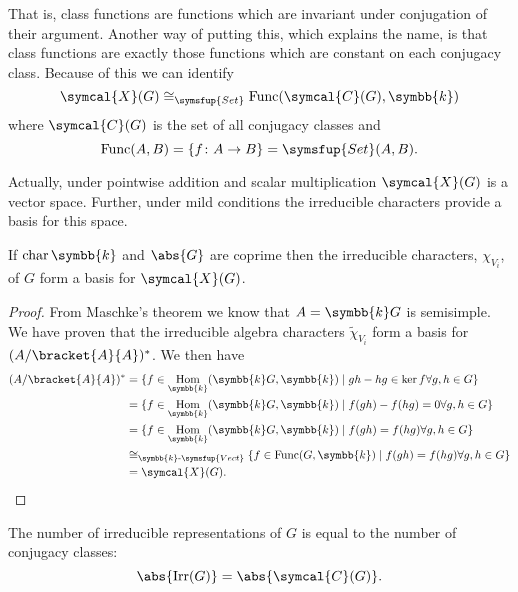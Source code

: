 \documentclass[fleqn]{NotesClass}
\makeatletter
\renewcommand{\field}{\symbb{k}}
\DeclareMathOperator{\Hom}{Hom}
\newcommand{\c@egory}[1]{\symsfup{#1}}
\newcommand{\Vect}[1][\field]{#1\text{-}\c@egory{Vect}}
\newcommand{\Set}{\c@egory{Set}}
\newcommand{\isomorphic}{\cong}
\DeclareMathOperator{\Irr}{Irr}
\DeclareMathOperator{\Char}{char}
\newcommand{\classFunctions}{\symcal{X}}
\newcommand{\conjugacyClasses}{\symcal{C}}
\DeclareMathOperator{\Func}{Func}
\makeatother
\begin{document}
    That is, class functions are functions which are invariant under conjugation of their argument.
    Another way of putting this, which explains the name, is that class functions are exactly those functions which are constant on each conjugacy class.
    Because of this we can identify
    \begin{equation}
        \classFunctions(G) \isomorphic_{\Set} \Func(\conjugacyClasses(G), \field)
    \end{equation}
    where \(\conjugacyClasses(G)\) is the set of all conjugacy classes and
    \begin{equation}
        \Func(A, B) = \{f \colon A \to B\} = \Set(A, B).
    \end{equation}
    
    Actually, under pointwise addition and scalar multiplication \(\classFunctions(G)\) is a vector space.
    Further, under mild conditions the irreducible characters provide a basis for this space.
    
    \begin{thm}{}{}
        If \(\Char \field\) and \(\abs{G}\) are coprime then the irreducible characters, \(\chi_{V_i}\), of \(G\) form a basis for \(\classFunctions(G)\).
        \begin{proof}
            From Maschke's theorem we know that \(A = \field G\) is semisimple.
            We have proven that the irreducible algebra characters \(\widetilde{\chi}_{V_i}\) form a basis for \((A/\bracket{A}{A})^*\).
            We then have
            \begin{align}
                (A/\bracket{A}{A})^* &= \{f \in \Hom_{\field}(\field G, \field) \mid gh - hg \in \ker f \forall g, h \in G\} \notag\\
                &= \{f \in \Hom_{\field}(\field G, \field) \mid f(gh) - f(hg) = 0 \forall g, h \in G\} \notag\\
                &= \{f \in \Hom_{\field}(\field G, \field) \mid f(gh) = f(hg) \forall g, h \in G\} \notag\\
                &\isomorphic_{\Vect} \{f \in \Func(G, \field) \mid f(gh) = f(hg) \forall g, h \in G\} \notag\\
                &= \classFunctions(G). \notag
            \end{align}
        \end{proof}
    \end{thm}
    
    \begin{crl}{}{}
        The number of irreducible representations of \(G\) is equal to the number of conjugacy classes:
        \begin{equation}
            \abs{\Irr(G)} = \abs{\conjugacyClasses(G)}.
        \end{equation}
    \end{crl}
    
\end{document}

